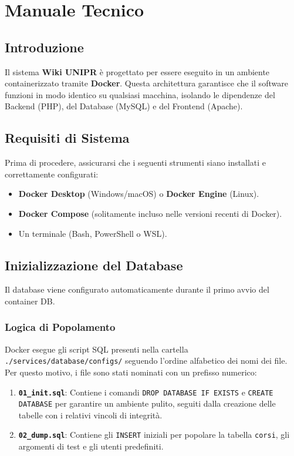 \chapter{Manuale Tecnico}

\section{Introduzione}
Il sistema \textbf{Wiki UNIPR} è progettato per essere eseguito in un ambiente containerizzato tramite \textbf{Docker}. Questa architettura garantisce che il software funzioni in modo identico su qualsiasi macchina, isolando le dipendenze del Backend (PHP), del Database (MySQL) e del Frontend (Apache).

\section{Requisiti di Sistema}
Prima di procedere, assicurarsi che i seguenti strumenti siano installati e correttamente configurati:
\begin{itemize}
    \item \textbf{Docker Desktop} (Windows/macOS) o \textbf{Docker Engine} (Linux).
    \item \textbf{Docker Compose} (solitamente incluso nelle versioni recenti di Docker).
    \item Un terminale (Bash, PowerShell o WSL).
\end{itemize}

\section{Inizializzazione del Database}
Il database viene configurato automaticamente durante il primo avvio del container DB. 
\subsection{Logica di Popolamento}
Docker esegue gli script SQL presenti nella cartella \texttt{./services/database/configs/} seguendo l'ordine alfabetico dei nomi dei file. Per questo motivo, i file sono stati nominati con un prefisso numerico:

\begin{enumerate}
    \item \textbf{\texttt{01\_init.sql}}: Contiene i comandi \texttt{DROP DATABASE IF EXISTS} e \texttt{CREATE DATABASE} per garantire un ambiente pulito, seguiti dalla creazione delle tabelle con i relativi vincoli di integrità.
    \item \textbf{\texttt{02\_dump.sql}}: Contiene gli \texttt{INSERT} iniziali per popolare la tabella \texttt{corsi}, gli argomenti di test e gli utenti predefiniti.
\end{enumerate}

